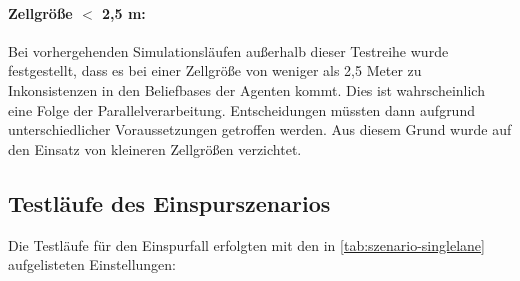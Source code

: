 \paragraph*{\texorpdfstring{Zellgröße $ < $ 2,5 m:}%
                              {Zellgröße kleiner als 2,5 m:}}
Bei vorhergehenden Simulationsläufen außerhalb dieser Testreihe wurde festgestellt, dass es bei einer Zellgröße von weniger als 2,5 Meter zu Inkonsistenzen in den Beliefbases der Agenten kommt.
Dies ist wahrscheinlich eine Folge der Parallelverarbeitung.
Entscheidungen müssten dann aufgrund unterschiedlicher Voraussetzungen getroffen werden.
Aus diesem Grund wurde auf den Einsatz von kleineren Zellgrößen verzichtet.






\subsection{Testläufe des Einspurszenarios}
\label{sec:test-singlelane}

Die Testläufe für den Einspurfall erfolgten mit den in \cref{tab:szenario-singlelane} aufgelisteten Einstellungen:

